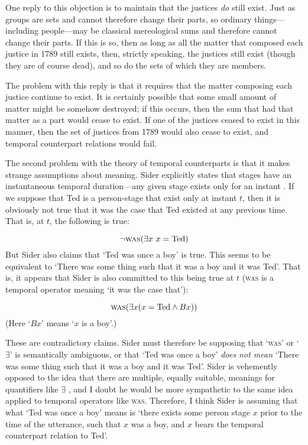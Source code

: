 \documentclass[11pt]{article}
\begin{document}
\begin{spacing}{1.5}
One reply to this objection is to maintain that the justices {\em do}
still exist.  Just as groups are sets and cannot therefore change
their parts, so ordinary things---including people---may be classical
mereological sums and therefore cannot change their parts.  If this is
so, then as long as all the matter that composed each justice in 1789
still exists, then, strictly speaking, the justices still exist
(though they are of course dead), and so do the sets of which they are
members.

The problem with this reply is that it requires that the matter
composing each justice continue to exist.  It is certainly possible
that some small amount of matter might be somehow destroyed; if this
occurs, then the sum that had that matter as a part would cease to
exist.  If one of the justices ceased to exist in this manner, then
the set of justices from 1789 would also cease to exist, and temporal
counterpart relations would fail.

The second problem with the theory of temporal counterparts is that it
makes strange assumptions about meaning.  Sider explicitly states that
stages have an instantaneous temporal duration---any given stage
exists only for an instant \citeyearpar[xiv]{sider2001}.  If we
suppose that Ted is a person-stage that exist only at instant $t$,
then it is obviously not true that it was the case that Ted existed at
any previous time.  That is, at $t$, the following is true:

\begin{displaymath}
\neg \textsc{was} (\exists x\ x = \text{Ted})
\end{displaymath}
But Sider also claims that `Ted was once a boy' is true.  This seems
to be equivalent to `There was some thing such that it was a boy and
it was Ted'.  That is, it appears that Sider is also committed to this
being true at $t$ (\textsc{was} is a temporal operator meaning `it was
the case that'):

\begin{displaymath}
\textsc{was} (\exists x ( x = \text{Ted} \wedge Bx ))
\end{displaymath}
(Here `$Bx$' means `$x$ is a boy'.)

These are contradictory claims.  Sider must therefore be supposing
that `\textsc{was}' or `$\exists$' is semantically ambiguous, or that
`Ted was once a boy' {\em does not mean} `There was some thing such
that it was a boy and it was Ted'.  Sider is vehemently opposed to the
idea that there are multiple, equally suitable, meanings for
quantifiers like $\exists$
\citeyearpar{sider2001,sider2011b,sider2011d}, and I doubt he would be
more sympathetic to the same idea applied to temporal operators like
\textsc{was}.  Therefore, I think Sider is assuming that what `Ted was
once a boy' means is `there exists some person stage $x$ prior to the
time of the utterance, such that $x$ was a boy, and $x$ bears the
temporal counterpart relation to Ted'.


\end{spacing}
\end{document}

